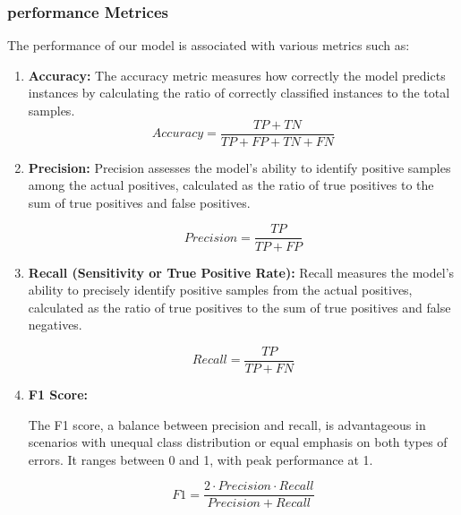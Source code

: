 \subsubsection{performance Metrices}

The performance of our model is associated with various metrics such as:
\begin{enumerate}
    \item \textbf{Accuracy:}
          The accuracy metric measures how correctly the model predicts instances by calculating the ratio of correctly classified instances to the total samples.
          \[ Accuracy = \frac{TP + TN}{TP + FP + TN + FN} \]

    \item \textbf{Precision:}
          Precision assesses the model's ability to identify positive samples among the actual positives, calculated as the ratio of true positives to the sum of true positives and false positives.

          \[ Precision = \frac{TP}{TP + FP} \]

    \item \textbf{Recall (Sensitivity or True Positive Rate):}
          Recall measures the model's ability to precisely identify positive samples from the actual positives, calculated as the ratio of true positives to the sum of true positives and false negatives.

          \[ Recall = \frac{TP}{TP + FN} \]


    \item \textbf{F1 Score:}

          The F1 score, a balance between precision and recall, is advantageous in scenarios with unequal class distribution or equal emphasis on both types of errors. It ranges between 0 and 1, with peak performance at 1.

          \[ F1 = \frac{2 \cdot Precision \cdot Recall}{Precision + Recall} \]

\end{enumerate}
\newpage
